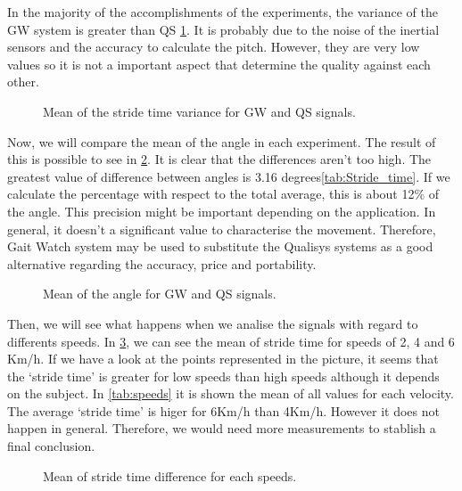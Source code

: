 In the majority of the accomplishments of the experiments, the variance of the GW system is greater than QS \ref{fig:var_stride_time}. It is probably due to the noise of the inertial sensors and the accuracy to calculate the pitch. However, they are very low values so it is not a important aspect that determine the quality against each other. 

\begin{figure}[H]
	\centering
	\caption{Mean of the stride time variance for GW and QS signals.}
	\label{fig:var_stride_time}
\end{figure}

Now, we will compare the mean of the angle in each experiment. The result of this is possible to see in \ref{fig:mean_angle}. It is clear that the differences aren’t too high. The greatest value of difference between angles is 3.16 degrees\ref{tab:Stride_time}. If we calculate the percentage with respect to the total average, this is about 12\% of the angle. This precision might be important depending on the application. In general, it doesn’t a significant value to characterise the movement. Therefore, Gait Watch system may be used to substitute the Qualisys systems as a good alternative regarding the accuracy, price and portability.

\begin{figure}[H]
	\centering
	\caption{Mean of the angle for GW and QS signals.}
	\label{fig:mean_angle}
\end{figure}

Then, we will see what happens when we analise the signals with regard to differents speeds. In \ref{fig:speed_stride_time}, we can see the mean of stride time for speeds of 2, 4 and 6 Km/h. If we have a look at the points represented in the picture, it seems that the ‘stride time’ is greater for low speeds than high speeds although it depends on the subject. In \ref{tab:speeds} it is shown the mean of all values for each velocity. The average ‘stride time’ is higer for 6Km/h than 4Km/h. However it does not happen in general. Therefore, we would need more measurements to stablish a final conclusion.

\begin{figure}[H]
	\centering
	\caption{Mean of stride time difference for each speeds.}
	\label{fig:speed_stride_time}
\end{figure}


